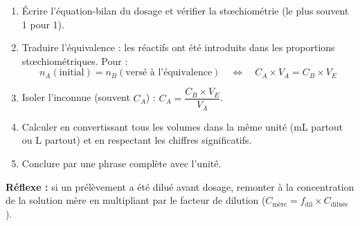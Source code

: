 \documentclass[11pt]{article}
\newcommand{\cle}[1]{{\popxbold\color{popdark}#1}}
\begin{document}
\begin{methode}
\begin{enumerate}
\item \cle{Écrire} l'équation-bilan du dosage et vérifier la stœchiométrie (le plus souvent 1 pour 1).
\item \cle{Traduire} l'équivalence : les réactifs ont été introduits dans les proportions stœchiométriques. Pour  :
\[ n_A(\text{initial}) = n_B(\text{versé à l'équivalence}) \quad \Longleftrightarrow \quad C_A \times V_A = C_B \times V_E \]
\item \cle{Isoler} l'inconnue (souvent $C_A$) : $C_A = \dfrac{C_B \times V_E}{V_A}$.
\item \cle{Calculer} en convertissant tous les volumes dans la même unité (mL partout ou L partout) et en respectant les chiffres significatifs.
\item \cle{Conclure} par une phrase complète avec l'unité.
\end{enumerate}
\textbf{Réflexe :} si un prélèvement a été dilué avant dosage, remonter à la concentration de la solution mère en multipliant par le facteur de dilution ($C_{\text{mère}} = f_{\text{dil}} \times C_{\text{diluée}}$).
\end{methode}
\end{document}
